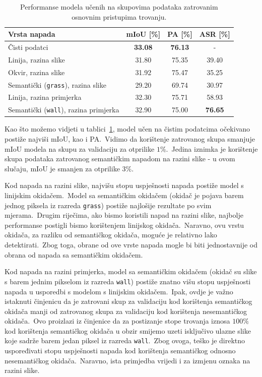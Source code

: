 \documentclass[times, utf8, seminar, numeric]{fer}
\begin{document}
\begin{table}[htb]
    \caption{Performanse modela učenih na skupovima podataka zatrovanim osnovnim pristupima trovanju.}
    \label{tbl:performanse_zatrovano}
    \centering
    \begin{tabular}{lccc} \hline
    Vrsta napada & mIoU [\%] & PA [\%] & ASR [\%] \\ \hline
    Čisti podatci & \textbf{33.08} & \textbf{76.13} & - \\ \hline
    Linija, razina slike & 31.80 & 75.35 & 39.40 \\
    Okvir, razina slike & 31.92 & 75.47 & 35.25 \\
    Semantički (\texttt{grass}), razina slike & 29.20 & 69.74 & 30.97 \\ \hline
    Linija, razina primjerka & 32.30 & 75.71 & 58.93 \\
    Semantički (\texttt{wall}), razina primjerka & 32.90 & 75.00 & \textbf{76.65} \\ \hline
    \end{tabular}
\end{table}

Kao što možemo vidjeti u tablici~\ref{tbl:performanse_zatrovano}, model učen na čistim podatcima očekivano postiže najviši mIoU, kao i PA.\ 
Vidimo da korištenje zatrovanog skupa smanjuje mIoU modela na skupu za validaciju za otprilike $1\%$.\ 
Jedina iznimka je korištenje skupa podataka zatrovanog semantičkim napadom na razini slike - u ovom slučaju, mIoU je smanjen za otprilike $3\%$.\ 
  
Kod napada na razini slike, najvišu stopu uspješnosti napada postiže model s linijskim okidačem.\ 
Model sa semantičkim okidačem (okidač je pojava barem jednog piksela iz razreda \texttt{grass}) postiže najlošije rezultate po svim mjerama.\ 
Drugim riječima, ako bismo koristili napad na razini slike, najbolje performanse postigli bismo korištenjem linijskog okidača.\ 
Naravno, ovu vrstu okidača, za razliku od semantičkog okidača, moguće je relativno lako detektirati.\ 
Zbog toga, obrane od ove vrste napada mogle bi biti jednostavnije od obrana od napada sa semantičkim okidačem.\ 

Kod napada na razini primjerka, model sa semantičkim okidačem (okidač su slike s barem jednim pikselom iz razreda \texttt{wall}) postiže znatno višu stopu uspješnosti napada u usporedbi s modelom s linijskim okidačem.\ 
Ipak, ovdje je važno istaknuti činjenicu da je zatrovani skup za validaciju kod korištenja semantičkog okidača manji od zatrovanog skupa za validaciju kod korištenja nesemantičkog okidača.\ 
Ovo proizlazi iz činjenice da za postizanje stope trovanja iznosa $100\%$ kod korištenja semantičkog okidača u obzir smijemo uzeti isključivo ulazne slike koje sadrže barem jedan piksel iz razreda \texttt{wall}.\ 
Zbog ovoga, teško je direktno uspoređivati stopu uspješnosti napada kod korištenja semantičkog odnosno nesemantičkog okidača.\ 
Naravno, ista primjedba vrijedi i za izmjenu oznaka na razini slike.\ 
\end{document}
